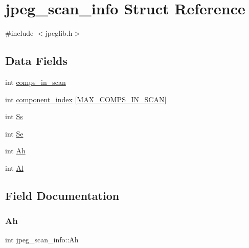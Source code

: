 \hypertarget{structjpeg__scan__info}{}\section{jpeg\+\_\+scan\+\_\+info Struct Reference}
\label{structjpeg__scan__info}


{\ttfamily \#include $<$jpeglib.\+h$>$}

\subsection*{Data Fields}
\begin{DoxyCompactItemize}
\item 
int \hyperlink{structjpeg__scan__info_addd94bff3ee52f961cf6fda5ea86ddca}{comps\+\_\+in\+\_\+scan}
\item 
int \hyperlink{structjpeg__scan__info_a041f1af60508517345c1b76c48ee6567}{component\+\_\+index} \mbox{[}\hyperlink{jpeglib_8h_adc7013da016c19051dc623fb3d8b35b4}{M\+A\+X\+\_\+\+C\+O\+M\+P\+S\+\_\+\+I\+N\+\_\+\+S\+C\+AN}\mbox{]}
\item 
int \hyperlink{structjpeg__scan__info_a33bc5abcded36ccd1b4c2ec94f6e2ba5}{Ss}
\item 
int \hyperlink{structjpeg__scan__info_a4eefb8be0412f78566862c28a20fb254}{Se}
\item 
int \hyperlink{structjpeg__scan__info_a43834ca9482c7ea12cc97cf602da004b}{Ah}
\item 
int \hyperlink{structjpeg__scan__info_a89cc9e990977c50b2b2058e6b9526e67}{Al}
\end{DoxyCompactItemize}


\subsection{Field Documentation}
\mbox{\label{structjpeg__scan__info_a43834ca9482c7ea12cc97cf602da004b}} 
\subsubsection{\texorpdfstring{Ah}{Ah}}
{\footnotesize\ttfamily int jpeg\+\_\+scan\+\_\+info\+::\+Ah}

\mbox{\label{structjpeg__scan__info_a89cc9e990977c50b2b2058e6b9526e67}} 
